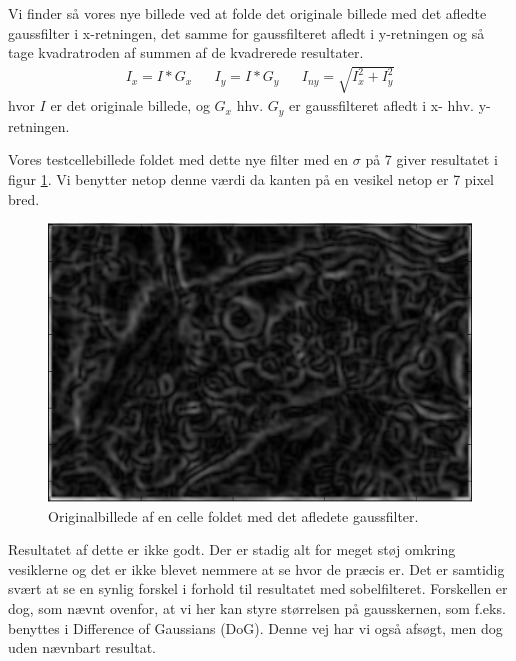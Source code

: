 Vi finder så vores nye billede ved at folde det originale billede med det afledte gaussfilter i x-retningen, det samme for gaussfilteret afledt i y-retningen og så tage kvadratroden af summen af de kvadrerede resultater.
\begin{align}
	I_x = I * G_x && I_y = I * G_y && I_{ny} = \sqrt{I_x^2+I_y^2}
\end{align} 
hvor $I$ er det originale billede, og $G_x$ hhv. $G_y$ er gaussfilteret afledt i x- hhv. y-retningen.

Vores testcellebillede foldet med dette nye filter med en $\sigma$ på 7 giver resultatet i figur \ref{fig:premethod_gaussCell}. Vi benytter netop denne værdi da kanten på en vesikel netop er 7 pixel bred.
\begin{figure}[H]
	\centering
	\includegraphics[scale=0.8]{files/premethod/img/gauss_derived_cell2.png}
	\caption{Originalbillede af en celle foldet med det afledete gaussfilter.\label{fig:premethod_gaussCell}}
\end{figure}

Resultatet af dette er ikke godt. Der er stadig alt for meget støj omkring vesiklerne og det er ikke blevet nemmere at se hvor de præcis er. Det er samtidig svært at se en synlig forskel i forhold til resultatet med sobelfilteret. Forskellen er dog, som nævnt ovenfor, at vi her kan styre størrelsen på gausskernen, som f.eks. benyttes i Difference of Gaussians (DoG). Denne vej har vi også afsøgt, men dog uden nævnbart resultat. 


